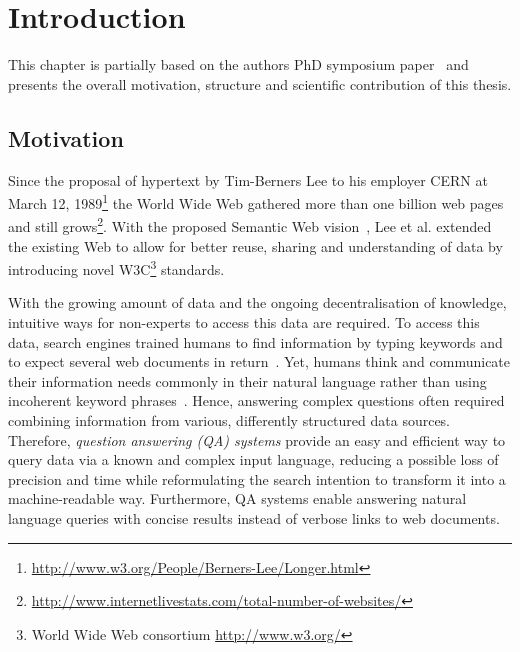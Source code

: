 \chapter{Introduction}
This chapter is partially based on the authors PhD symposium paper~\cite{combiningLDandIR} and presents the overall motivation, structure and scientific contribution of this thesis.
\section{Motivation}
Since the proposal of hypertext by Tim-Berners Lee to his employer CERN at March 12, 1989\footnote{\url{http://www.w3.org/People/Berners-Lee/Longer.html}} the World Wide Web gathered more than one billion web pages and still grows\footnote{\url{http://www.internetlivestats.com/total-number-of-websites/}}.
With the proposed Semantic Web vision~\cite{bernerslee2001semantic}, Lee et al. extended the existing Web to allow for better reuse, sharing and understanding of data by introducing novel W3C\footnote{World Wide Web consortium \url{http://www.w3.org/}} standards. 

With the growing amount of data and the ongoing decentralisation of knowledge, intuitive ways for non-experts to access this data are required. 
To access this data, search engines trained humans to find information by typing keywords and to expect several web documents in return~\cite{ilprints361}.
Yet, humans think and communicate their information needs commonly in their natural language rather than using incoherent keyword phrases~\cite{woods1973progress}. 
Hence, answering complex questions often required combining information from various, differently structured data sources.
Therefore, \emph{question answering (QA) systems} provide an easy and efficient way to query data via a known and complex input language, reducing a possible loss of precision and time while reformulating the search intention to transform it into a machine-readable way.
Furthermore, QA systems enable answering natural language queries with concise results instead of verbose links to web documents. 



